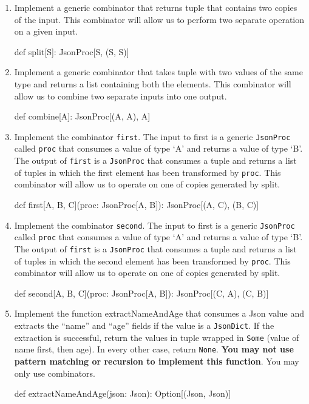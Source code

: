 \documentclass[9pt]{extbook}
\begin{document}
\begin{enumerate}
    \item Implement a generic combinator that returns tuple that contains
    two copies of the input. This combinator will allow us to perform two
    separate operation on a given input.
    \begin{scalacode}
    def split[S]: JsonProc[S, (S, S)]
    \end{scalacode}

    \item Implement a generic combinator that takes tuple with two values
    of the same type and returns a list containing both the elements. This
    combinator will allow us to combine two separate inputs into one output.
    \begin{scalacode}
    def combine[A]: JsonProc[(A, A), A]
    \end{scalacode}

    \item Implement the combinator \texttt{first}. The input to first is a
    generic \texttt{JsonProc} called \texttt{proc} that consumes a value of
    type `A' and returns a value of type `B'. The output of \texttt{first} is
    a \texttt{JsonProc} that consumes a tuple and returns a list of tuples in
    which the first element has been transformed by \texttt{proc}. This
    combinator will allow us to operate on one of copies generated by split.
    \begin{scalacode}
    def first[A, B, C](proc: JsonProc[A, B]): JsonProc[(A, C), (B, C)]
    \end{scalacode}

    \item Implement the combinator \texttt{second}. The input to first is a
    generic \texttt{JsonProc} called \texttt{proc} that consumes a value of
    type `A' and returns a value of type `B'. The output of \texttt{first} is
    a \texttt{JsonProc} that consumes a tuple and returns a list of tuples in
    which the second element has been transformed by \texttt{proc}. This
    combinator will allow us to operate on one of copies generated by split.
    \begin{scalacode}
    def second[A, B, C](proc: JsonProc[A, B]): JsonProc[(C, A), (C, B)]
    \end{scalacode}

    \item Implement the function extractNameAndAge that consumes a Json value
    and extracts the ``name'' and ``age'' fields if the value is a
    \texttt{JsonDict}. If the extraction is successful, return the values in
    tuple wrapped in \texttt{Some} (value of name first, then age). In every
    other case, return \texttt{None}. \textbf{You may not use pattern
    matching or recursion to implement this function}. You may only use
    combinators.
    \begin{scalacode}
    def extractNameAndAge(json: Json): Option[(Json, Json)]
    \end{scalacode}


\end{enumerate}
\end{document}
